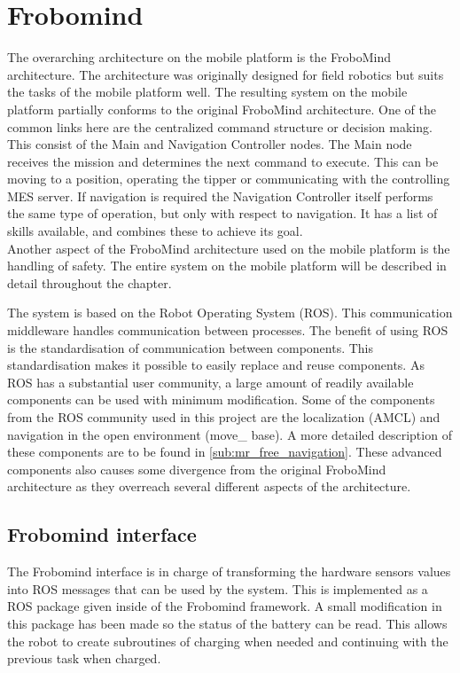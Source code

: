 \section{Frobomind} %
\label{sec:mr_frobomind}

The overarching architecture on the mobile platform is the FroboMind architecture. The architecture was originally designed for field robotics but suits the tasks of the mobile platform well. The resulting system on the mobile platform partially conforms to the original FroboMind architecture. One of the common links here are the centralized command structure or decision making. This consist of the Main and Navigation Controller nodes. The Main node receives the mission and determines the next command to execute. This can be moving to a position, operating the tipper or communicating with the controlling MES server. If navigation is required the Navigation Controller itself performs the same type of operation, but only with respect to navigation. It has a list of skills available, and combines these to achieve its goal. \\
Another aspect of the FroboMind architecture used on the mobile platform is the handling of safety. The entire system on the mobile platform will be described in detail throughout the chapter. 

The system is based on the Robot Operating System (ROS). This communication middleware handles communication between processes. The benefit of using ROS is the standardisation of communication between components. This standardisation makes it possible to easily replace and reuse components. 
As ROS has a substantial user community, a large amount of readily available components can be used with minimum modification. Some of the components  from the ROS community used in this project are the localization (AMCL) and navigation in the open environment (move\_ base). 
A more detailed description of these components are to be found in \ref{sub:mr_free_navigation}. These advanced components also causes some divergence from the original FroboMind architecture as they overreach several different aspects of the architecture. 



	\subsection{Frobomind interface} %
	\label{sub:mr_frobomind_interface}
	The Frobomind interface is in charge of transforming the hardware sensors values into ROS messages that can be used by the system.
	This is implemented as a ROS package given inside of the Frobomind framework.
	A small modification in this package has been made so the status of the battery can be read.
	This allows the robot to create subroutines of charging when needed and continuing with the previous task when charged.

